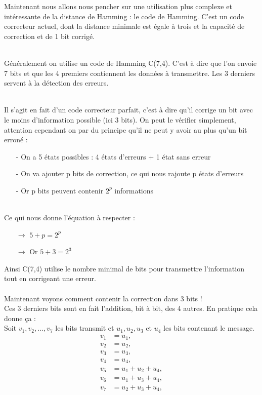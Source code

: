 Maintenant nous allons nous pencher sur une utilisation plus complexe et intéressante de la distance de Hamming : le code de Hamming. C’est un code correcteur actuel, dont la distance minimale est égale à trois et la capacité de correction et de 1 bit corrigé.


\\\tab Généralement on utilise un code de Hamming C(7,4). C'est à dire que l'on envoie 7 bits et que les 4 premiers contiennent les données à transmettre. Les 3 derniers servent à la détection des erreurs.

\\\tab Il s'agit en fait d'un code correcteur parfait, c'est à dire qu'il corrige un bit avec le moins d'information possible (ici 3 bits). On peut le vérifier simplement, attention cependant on par du principe qu'il ne peut y avoir au plus qu'un bit erroné :
\begin{enumerate}
  \item[-] On a 5 états possibles : 4 états d'erreurs + 1 état sans erreur
  \item[-] On va ajouter p bits de correction, ce qui nous rajoute p états d'erreurs
  \item[-] Or p bits peuvent contenir $2^p$ informations
\end{enumerate}
\\ Ce qui nous donne l'équation à respecter :
\begin{enumerate}
  \item[$\rightarrow$] $ 5 + p = 2^p$
  \item[$\rightarrow$] Or $ 5 + 3 = 2^3$
\end{enumerate}
Ainsi C(7,4) utilise le nombre minimal de bits pour transmettre l'information tout en corrigeant une erreur.
\\
\\ Maintenant voyons comment contenir la correction dans 3 bits !
\\ Ces 3 derniers bits sont en fait l'addition, bit à bit, des 4 autres. En pratique cela donne ça :
\\ Soit $v_1, v_2, \ldots, v_7$ les bits transmit et $u_1, u_2, u_3$ et $u_4$ les bits contenant le message.
\begin{align*}
  v_1 &= u_1,\\
  v_2 &= u_2,\\
  v_3 &= u_3,\\
  v_4 &= u_4,\\
  v_5 &= u_1 + u_2 + u_4,\\
  v_6 &= u_1 + u_3 + u_4,\\
  v_7 &= u_2 + u_3 + u_4,
\end{align*}
